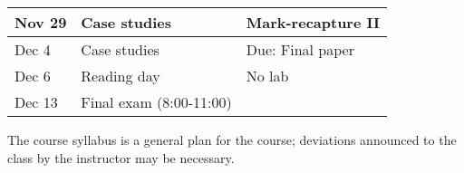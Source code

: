 \documentclass[12pt]{article}
\begin{document}
\begin{center}
\begin{tabular}[c]{lll}
Nov 29     & Case studies                       & Mark-recapture II                    \\
\hline
Dec 4      & Case studies                       & Due: Final paper                     \\
Dec 6      & Reading day                        & No lab                               \\
\hline
Dec 13     & Final exam (8:00-11:00)            &                                      \\
\hline \hline
\end{tabular}
\end{center}

The course syllabus is a general plan for the course; deviations announced to the class by the instructor may be necessary.
\end{document}
